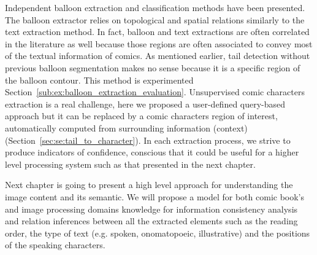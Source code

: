 Independent balloon extraction and classification methods have been presented.
The balloon extractor relies on topological and spatial relations similarly to the text extraction method.
In fact, balloon and text extractions are often correlated in the literature as well because those regions are often associated to convey most of the textual information of comics.
As mentioned earlier, tail detection without previous balloon segmentation makes no sense because it is a specific region of the balloon contour.
This method is experimented Section~\ref{sub:ex:balloon_extraction_evaluation}.
Unsupervised comic characters extraction is a real challenge, here we proposed a user-defined query-based approach but it can be replaced by a comic characters region of interest, automatically computed from surrounding information (context) (Section~\ref{sec:se:tail_to_character}).
In each extraction process, we strive to produce indicators of confidence, conscious that it could be useful for a higher level processing system such as that presented in the next chapter.

Next chapter is going to present a high level approach for understanding the image content and its semantic.
We will propose a model for both comic book's and image processing domains knowledge for information consistency analysis and relation inferences between all the extracted elements such as the reading order, the type of text (e.g. spoken, onomatopoeic, illustrative) and the positions of the speaking characters.



